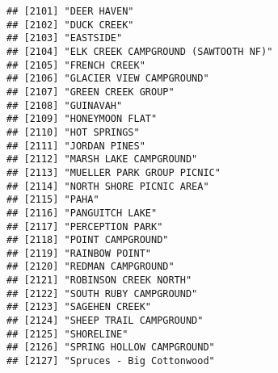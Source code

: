 \documentclass[
]{article}
\begin{document}
\begin{verbatim}
## [2101] "DEER HAVEN"                                                                          
## [2102] "DUCK CREEK"                                                                          
## [2103] "EASTSIDE"                                                                            
## [2104] "ELK CREEK CAMPGROUND (SAWTOOTH NF)"                                                  
## [2105] "FRENCH CREEK"                                                                        
## [2106] "GLACIER VIEW CAMPGROUND"                                                             
## [2107] "GREEN CREEK GROUP"                                                                   
## [2108] "GUINAVAH"                                                                            
## [2109] "HONEYMOON FLAT"                                                                      
## [2110] "HOT SPRINGS"                                                                         
## [2111] "JORDAN PINES"                                                                        
## [2112] "MARSH LAKE CAMPGROUND"                                                               
## [2113] "MUELLER PARK GROUP PICNIC"                                                           
## [2114] "NORTH SHORE PICNIC AREA"                                                             
## [2115] "PAHA"                                                                                
## [2116] "PANGUITCH LAKE"                                                                      
## [2117] "PERCEPTION PARK"                                                                     
## [2118] "POINT CAMPGROUND"                                                                    
## [2119] "RAINBOW POINT"                                                                       
## [2120] "REDMAN CAMPGROUND"                                                                   
## [2121] "ROBINSON CREEK NORTH"                                                                
## [2122] "SOUTH RUBY CAMPGROUND"                                                               
## [2123] "SAGEHEN CREEK"                                                                       
## [2124] "SHEEP TRAIL CAMPGROUND"                                                              
## [2125] "SHORELINE"                                                                           
## [2126] "SPRING HOLLOW CAMPGROUND"                                                            
## [2127] "Spruces - Big Cottonwood"                                                            

\end{verbatim}
\end{document}
